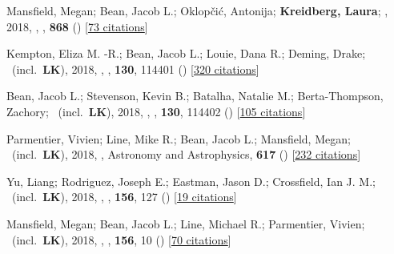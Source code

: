 \item[{\color{numcolor}\scriptsize25}] Mansfield, Megan; Bean, Jacob L.; Oklop{\v{c}}i{\'c}, Antonija; \textbf{Kreidberg, Laura}; \etal, 2018, , \apj, \textbf{868} () [\href{https://ui.adsabs.harvard.edu/abs/2018ApJ...868L..34M}{73 citations}]

\item[{\color{numcolor}\scriptsize24}] Kempton, Eliza M. -R.; Bean, Jacob L.; Louie, Dana R.; Deming, Drake; \etal\ (incl.\ \textbf{LK}), 2018, , \pasp, \textbf{130}, 114401 () [\href{https://ui.adsabs.harvard.edu/abs/2018PASP..130k4401K}{320 citations}]

\item[{\color{numcolor}\scriptsize23}] Bean, Jacob L.; Stevenson, Kevin B.; Batalha, Natalie M.; Berta-Thompson, Zachory; \etal\ (incl.\ \textbf{LK}), 2018, , \pasp, \textbf{130}, 114402 () [\href{https://ui.adsabs.harvard.edu/abs/2018PASP..130k4402B}{105 citations}]

\item[{\color{numcolor}\scriptsize22}] Parmentier, Vivien; Line, Mike R.; Bean, Jacob L.; Mansfield, Megan; \etal\ (incl.\ \textbf{LK}), 2018, , Astronomy and Astrophysics, \textbf{617} () [\href{https://ui.adsabs.harvard.edu/abs/2018A&A...617A.110P}{232 citations}]

\item[{\color{numcolor}\scriptsize21}] Yu, Liang; Rodriguez, Joseph E.; Eastman, Jason D.; Crossfield, Ian J. M.; \etal\ (incl.\ \textbf{LK}), 2018, , \aj, \textbf{156}, 127 () [\href{https://ui.adsabs.harvard.edu/abs/2018AJ....156..127Y}{19 citations}]

\item[{\color{numcolor}\scriptsize20}] Mansfield, Megan; Bean, Jacob L.; Line, Michael R.; Parmentier, Vivien; \etal\ (incl.\ \textbf{LK}), 2018, , \aj, \textbf{156}, 10 () [\href{https://ui.adsabs.harvard.edu/abs/2018AJ....156...10M}{70 citations}]

